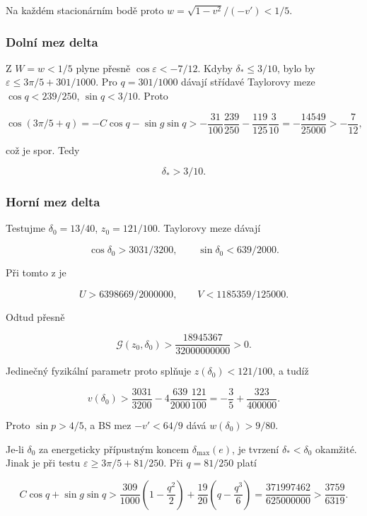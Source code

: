 \documentclass[11pt,a4paper]{article}
\theoremstyle{remark}\newtheorem{remark}[theorem]{Poznámka}
\numberwithin{equation}{section}
\begin{document}
Na každém stacionárním bodě proto \(w=\sqrt{1-v^2}/(-v')<1/5\).

\hypertarget{dolnuxed-mez-delta}{%
\subsubsection{Dolní mez delta}\label{dolnuxed-mez-delta}}

Z \(W=w<1/5\) plyne přesně \(\cos\varepsilon<-7/12\). Kdyby
\(\delta_*\le3/10\), bylo by \(\varepsilon\le3\pi/5+301/1000\). Pro
\(q=301/1000\) dávají střídavé Taylorovy meze \(\cos q<239/250\),
\(\sin q<3/10\). Proto

\[
\cos(3\pi/5+q)
=-C\cos q-\sin g\sin q
>-\frac{31}{100}\frac{239}{250}
 -\frac{119}{125}\frac3{10}
=-\frac{14549}{25000}>-\frac7{12},
\]

což je spor. Tedy

\[
\delta_*>3/10.
\tag{CG7}
\]

\hypertarget{hornuxed-mez-delta}{%
\subsubsection{Horní mez delta}\label{hornuxed-mez-delta}}

Testujme \(\delta_0=13/40\), \(z_0=121/100\). Taylorovy meze dávají

\[
\cos\delta_0>3031/3200,\qquad
\sin\delta_0<639/2000.
\]

Při tomto z je

\[
U>6398669/2000000,\qquad V<1185359/125000.
\]

Odtud přesně

\[
\mathscr G(z_0,\delta_0)
>\frac{18945367}{32000000000}>0.
\tag{CG8}
\]

Jedinečný fyzikální parametr proto splňuje \(z(\delta_0)<121/100\), a
tudíž

\[
v(\delta_0)>
\frac{3031}{3200}
-4\frac{639}{2000}\frac{121}{100}
=-\frac35+\frac{323}{400000}.
\tag{CG9}
\]

Proto \(\sin p>4/5\), a BS mez \(-v'<64/9\) dává \(w(\delta_0)>9/80\).

Je-li \(\delta_0\) za energeticky přípustným koncem
\(\delta_{\max}(e)\), je tvrzení \(\delta_*<\delta_0\) okamžité. Jinak
je při testu \(\varepsilon\ge3\pi/5+81/250\). Při \(q=81/250\) platí

\[
C\cos q+\sin g\sin q
>\frac{309}{1000}\left(1-\frac{q^2}{2}\right)
 +\frac{19}{20}\left(q-\frac{q^3}{6}\right)
=\frac{371997462}{625000000}
>\frac{3759}{6319}.
\]
\end{document}
